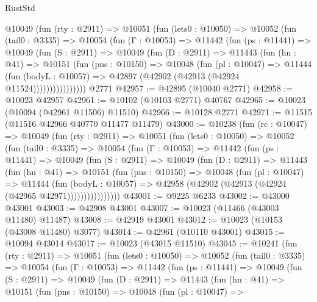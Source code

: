 \begin{lexlean}{RustStd}
\begin{coremodule}
      @10049
        (fun (rty : @2911) =>
        @10051
          (fun (lets0 : @10050) =>
          @10052
            (fun (tail0 : @3335) =>
            @10054
              (fun (Γ : @10053) =>
              @11442
                (fun (ps : @11441) =>
                @10049
                  (fun (S : @2911) =>
                  @10049
                    (fun (D : @2911) =>
                    @11443
                      (fun (hn : @41) =>
                      @10151
                        (fun (pns : @10150) =>
                        @10048
                          (fun (pl : @10047) =>
                          @11444
                            (fun (bodyL : @10057) =>
                            @42897 (@42902 (@42913 (@42924 @11524))))))))))))))))
    @2771
@42957 := @42895 (@10040 @2771)
@42958 := @10023 @42957
@42961 := @10102 (@10103 @2771) @40767
@42965 := @10023 (@10094 (@42961 @11506) @11510)
@42966 := @10128 @2771
@42971 := @11515 (@11516 @42966 @40770 @11477 @11479)
@43000 := @10238
    (fun (rc : @10047) =>
    @10049
      (fun (rty : @2911) =>
      @10051
        (fun (lets0 : @10050) =>
        @10052
          (fun (tail0 : @3335) =>
          @10054
            (fun (Γ : @10053) =>
            @11442
              (fun (ps : @11441) =>
              @10049
                (fun (S : @2911) =>
                @10049
                  (fun (D : @2911) =>
                  @11443
                    (fun (hn : @41) =>
                    @10151
                      (fun (pns : @10150) =>
                      @10048
                        (fun (pl : @10047) =>
                        @11444
                          (fun (bodyL : @10057) =>
                          @42958 (@42902 (@42913 (@42924 (@42965 @42971))))))))))))))))
@43001 := @9225 @6233
@43002 := @43000 @43001
@43003 := @42908 @43001
@43007 := @10023 (@11466 (@43003 @11480) @11487)
@43008 := @42919 @43001
@43012 := @10023 (@10153 (@43008 @11480) @3077)
@43014 := @42961 (@10110 @43001)
@43015 := @10094 @43014
@43017 := @10023 (@43015 @11510)
@43045 := @10241
    (fun (rty : @2911) =>
    @10051
      (fun (lets0 : @10050) =>
      @10052
        (fun (tail0 : @3335) =>
        @10054
          (fun (Γ : @10053) =>
          @11442
            (fun (ps : @11441) =>
            @10049
              (fun (S : @2911) =>
              @10049
                (fun (D : @2911) =>
                @11443
                  (fun (hn : @41) =>
                  @10151
                    (fun (pns : @10150) =>
                    @10048
                      (fun (pl : @10047) =>

\end{coremodule}
\end{lexlean}
